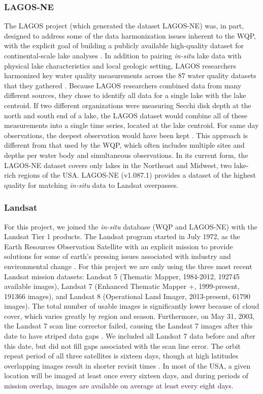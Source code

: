 \documentclass[draft,linenumbers]{agujournal2018}
\begin{document}
\subsubsection{LAGOS-NE}

The LAGOS project (which generated the dataset LAGOS-NE) was, in part,
designed to address some of the data harmonization issues inherent to
the WQP, with the explicit goal of building a publicly available
high-quality dataset for continental-scale lake analyses
\citep{Soranno2015,Soranno2017}. In addition to pairing \emph{in-situ}
lake data with physical lake characteristics and local geologic setting,
LAGOS researchers harmonized key water quality measurements across the
87 water quality datasets that they gathered
\citep{Soranno2015,Soranno2017}. Because LAGOS researchers combined data
from many different sources, they chose to identify all data for a
single lake with the lake centroid. If two different organizations were
measuring Secchi disk depth at the north and south end of a lake, the
LAGOS dataset would combine all of these measurements into a single time
series, located at the lake centroid. For same day observations, the
deepest observation would have been kept \citep{Soranno2015}. This
approach is different from that used by the WQP, which often includes
multiple sites and depths per water body and simultaneous observations.
In its current form, the LAGOS-NE dataset covers only lakes in the
Northeast and Midwest, two lake-rich regions of the USA. LAGOS-NE
(v1.087.1) provides a dataset of the highest quality for matching
\emph{in-situ} data to Landsat overpasses.

\subsubsection{Landsat}

For this project, we joined the \emph{in-situ} database (WQP and
LAGOS-NE) with the Landsat Tier 1 products. The Landsat program started
in July 1972, as the Earth Resources Observation Satellite with an
explicit mission to provide solutions for some of earth's pressing
issues associated with industry and environmental change
\citep{Loveland2012}. For this project we are only using the three most
recent Landsat mission datasets: Landsat 5 (Thematic Mapper, 1984-2012,
192745 available images), Landsat 7 (Enhanced Thematic Mapper +,
1999-present, 191366 images), and Landsat 8 (Operational Land Imager,
2013-present, 61790 images). The total number of usable images is
significantly lower because of cloud cover, which varies greatly by
region and season. Furthermore, on May 31, 2003, the Landsat 7 scan line
corrector failed, causing the Landsat 7 images after this date to have
striped data gaps \citep{Storey2005}. We included all Landsat 7 data
before and after this date, but did not fill gaps associated with the
scan line error. The orbit repeat period of all three satellites is
sixteen days, though at high latitudes overlapping images result in
shorter revisit times \citep{Loveland2012,Wulder2016}. In most of the
USA, a given location will be imaged at least once every sixteen days,
and during periods of mission overlap, images are available on average
at least every eight days.
\end{document}
